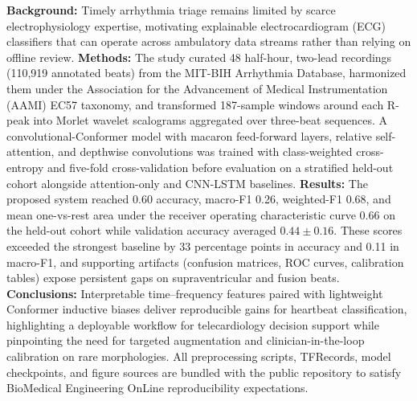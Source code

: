 \textbf{Background:} Timely arrhythmia triage remains limited by scarce electrophysiology expertise, motivating explainable electrocardiogram (ECG) classifiers that can operate across ambulatory data streams rather than relying on offline review.
\textbf{Methods:} The study curated 48 half-hour, two-lead recordings (110{,}919 annotated beats) from the MIT-BIH Arrhythmia Database, harmonized them under the Association for the Advancement of Medical Instrumentation (AAMI) EC57 taxonomy, and transformed 187-sample windows around each R-peak into Morlet wavelet scalograms aggregated over three-beat sequences. A convolutional-Conformer model with macaron feed-forward layers, relative self-attention, and depthwise convolutions was trained with class-weighted cross-entropy and five-fold cross-validation before evaluation on a stratified held-out cohort alongside attention-only and CNN-LSTM baselines.
\textbf{Results:} The proposed system reached 0.60 accuracy, macro-F1 0.26, weighted-F1 0.68, and mean one-vs-rest area under the receiver operating characteristic curve 0.66 on the held-out cohort while validation accuracy averaged $0.44\pm0.16$. These scores exceeded the strongest baseline by 33 percentage points in accuracy and 0.11 in macro-F1, and supporting artifacts (confusion matrices, ROC curves, calibration tables) expose persistent gaps on supraventricular and fusion beats.
\textbf{Conclusions:} Interpretable time--frequency features paired with lightweight Conformer inductive biases deliver reproducible gains for heartbeat classification, highlighting a deployable workflow for telecardiology decision support while pinpointing the need for targeted augmentation and clinician-in-the-loop calibration on rare morphologies. All preprocessing scripts, TFRecords, model checkpoints, and figure sources are bundled with the public repository to satisfy BioMedical Engineering OnLine reproducibility expectations.
